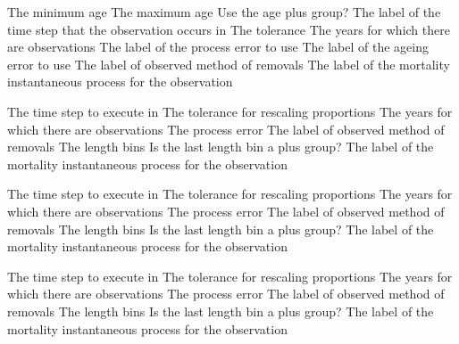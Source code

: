  {The minimum age}
 {The maximum age}
 {Use the age plus group?}
 {The label of the time step that the observation occurs in}
 {The tolerance}
 {The years for which there are observations}
 {The label of the process error to use}
 {The label of the ageing error to use}
 {The label of observed method of removals}
 {The label of the mortality instantaneous process for the observation}
\par\textbf{}\par
{} {The time step to execute in}
 {The tolerance for rescaling proportions}
 {The years for which there are observations}
 {The process error}
 {The label of observed method of removals}
 {The length bins}
 {Is the last length bin a plus group?}
 {The label of the mortality instantaneous process for the observation}
\par\textbf{}\par
{} {The time step to execute in}
 {The tolerance for rescaling proportions}
 {The years for which there are observations}
 {The process error}
 {The label of observed method of removals}
 {The length bins}
 {Is the last length bin a plus group?}
 {The label of the mortality instantaneous process for the observation}
\par\textbf{}\par
{} {The time step to execute in}
 {The tolerance for rescaling proportions}
 {The years for which there are observations}
 {The process error}
 {The label of observed method of removals}
 {The length bins}
 {Is the last length bin a plus group?}
 {The label of the mortality instantaneous process for the observation}
